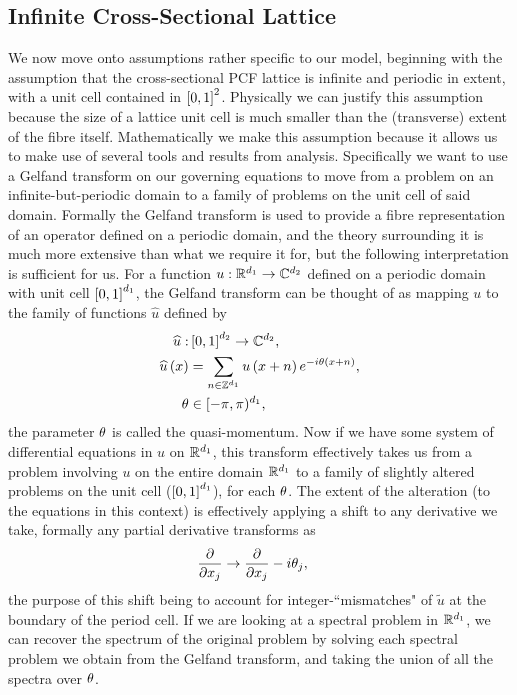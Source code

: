 \subsection{Infinite Cross-Sectional Lattice} \label{sec:ModellingAssumption2}
We now move onto assumptions rather specific to our model, beginning with the assumption that the cross-sectional PCF lattice is infinite and periodic in extent, with a unit cell contained in $\left[ 0,1 \right]^2$.
Physically we can justify this assumption because the size of a lattice unit cell is much smaller than the (transverse) extent of the fibre itself.
Mathematically we make this assumption because it allows us to make use of several tools and results from analysis.
Specifically we want to use a Gelfand transform on our governing equations to move from a problem on an infinite-but-periodic domain to a family of problems on the unit cell of said domain.
Formally the Gelfand transform is used to provide a fibre representation of an operator defined on a periodic domain, and the theory surrounding it is much more extensive than what we require it for, but the following interpretation is sufficient for us.
For a function $u:\mathbb{R}^{d_1}\rightarrow\mathbb{C}^{d_2}$ defined on a periodic domain with unit cell $\left[ 0,1 \right]^{d_1}$, the Gelfand transform can be thought of as mapping $u$ to the family of functions $\widehat{u}$ defined by
\begin{align*}
	\widehat{u}: &\left[ 0,1 \right]^{d_2} \rightarrow \mathbb{C}^{d_2}, \\
	\widehat{u}\left( x \right) &= \sum_{n\in\mathbb{Z}^{d_1}} u\left( x + n \right)e^{-i\theta\left( x + n \right)}, \\
	\theta &\in [-\pi,\pi)^{d_1},
\end{align*}
the parameter $\theta$ is called the quasi-momentum.
Now if we have some system of differential equations in $u$ on $\mathbb{R}^{d_1}$, this transform effectively takes us from a problem involving $u$ on the entire domain $\mathbb{R}^{d_1}$ to a family of slightly altered problems on the unit cell ($\left[ 0,1 \right]^{d_1}$), for each $\theta$.
The extent of the alteration (to the equations in this context) is effectively applying a shift to any derivative we take, formally any partial derivative transforms as
\begin{align*}
	\dfrac{\partial }{\partial x_j} &\rightarrow \dfrac{\partial }{\partial x_j} - i\theta_j,
\end{align*}
the purpose of this shift being to account for integer-``mismatches" of $\widetilde{u}$ at the boundary of the period cell.
If we are looking at a spectral problem in $\mathbb{R}^{d_1}$, we can recover the spectrum of the original problem by solving each spectral problem we obtain from the Gelfand transform, and taking the union of all the spectra over $\theta$. \newline

